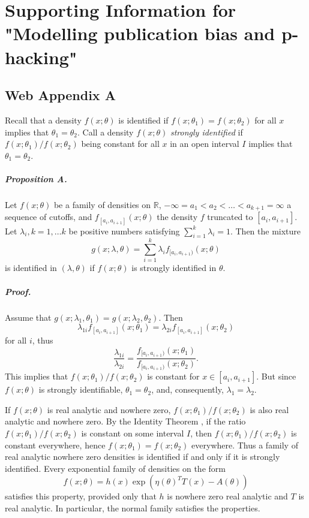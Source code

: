 \chapter{Supporting Information for "Modelling publication bias and p-hacking"}

\section*{Web Appendix A}

Recall that a density $f(x;\theta)$ is identified if $f(x;\theta_{1})=f(x;\theta_{2})$
for all $x$ implies that $\theta_{1}=\theta_{2}.$ Call a density
$f(x;\theta)$ \textit{strongly identified} if $f(x;\theta_{1})/f(x;\theta_{2})$
being constant for all $x$ in an open interval $I$ implies that
$\theta_{1}=\theta_{2}$.
\paragraph{Proposition A.}\label{prop:identified}

Let $f(x;\theta)$ be a family of densities on $\mathbb{R}$, $-\infty=a_{1}<a_{2}<\ldots<a_{k+1}=\infty$
a sequence of cutoffs, and $f_{[a_{i},a_{i+1}]}(x;\theta)$ the density
$f$ truncated to $[a_{i},a_{i+1}]$. Let $\lambda_{i},k=1,\ldots k$
be positive numbers satisfying $\sum_{i=1}^{k}\lambda_{i}=1$. Then
the mixture
\[
g(x;\lambda,\theta)=\sum_{i=1}^{k}\lambda_{i}f_{[a_{i},a_{i+1})}(x;\theta)
\]
is identified in $(\lambda,\theta)$ if $f(x;\theta)$ is strongly
identified in $\theta$.

\paragraph{Proof.}
Assume that $g(x;\lambda_{1},\theta_{1})=g(x;\lambda_{2},\theta_{2})$.
Then $$\lambda_{1i}f_{[a_{i},a_{i+1}]}(x;\theta_{1})=\lambda_{2i}f_{[a_{i},a_{i+1}]}(x;\theta_{2})$$
for all $i$, thus
\[
\frac{\lambda_{1i}}{\lambda_{2i}}=\frac{f_{[a_{i},a_{i+1})}(x;\theta_{1})}{f_{[a_{i},a_{i+1})}(x;\theta_{2})}.
\]
This implies that $f(x;\theta_{1})/f(x;\theta_{2})$ is constant for
$x\in[a_{i},a_{i+1}]$. But since $f(x;\theta)$ is strongly identifiable,
$\theta_{1}=\theta_{2}$, and, consequently, $\lambda_1 = \lambda_2$.


If $f(x;\theta)$ is real analytic and nowhere zero, $f(x;\theta_{1})/f(x;\theta_{2})$
is also real analytic and nowhere zero. By the Identity Theorem \parencite[Corollary 1.2.6]{Krantz2002-bt}, if the ratio
$f(x;\theta_{1})/f(x;\theta_{2})$ is constant on some interval $I$,
then $f(x;\theta_{1})/f(x;\theta_{2})$ is constant everywhere, hence
$f(x;\theta_{1})=f(x;\theta_{2})$ everywhere. Thus a family of real
analytic nowhere zero densities is identified if and only if it is
strongly identified. Every exponential family of densities on the form
\[
f(x;\theta)=h(x)\exp(\eta(\theta)^{T}T(x)-A(\theta))
\]
satisfies this property, provided only that $h$ is nowhere zero real analytic
and $T$ is real analytic. In particular, the normal family satisfies
the properties.

